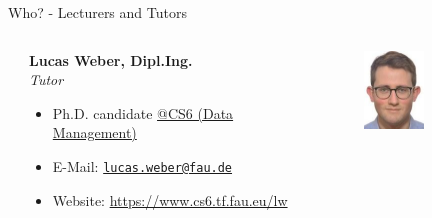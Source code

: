\begin{frame}{Who? - Lecturers and Tutors}
	\begin{columns}[T]
		\begin{column}{0.2\textwidth}
			\hfill
		\end{column}
		\begin{column}{0.6\textwidth}
			\textbf{Lucas Weber, Dipl.Ing.} \\
			\textit{Tutor}
			\begin{itemize}
				\item Ph.D. candidate \href{https://www.cs6.tf.fau.eu}{@CS6 (Data Management)}
				\item E-Mail: \texttt{\href{mailto:lucas.weber@fau.de}{lucas.weber@fau.de}}
				\item Website: \url{https://www.cs6.tf.fau.eu/lw}
			\end{itemize}
		\end{column}
		\begin{column}{0.2\textwidth}
			\vspace{-1em}
			\begin{figure}[t]
				\centering
				\includegraphics[width=0.55\textwidth]{img/lucas_weber.jpg}
			\end{figure}
		\end{column}
	\end{columns}
\end{frame}

